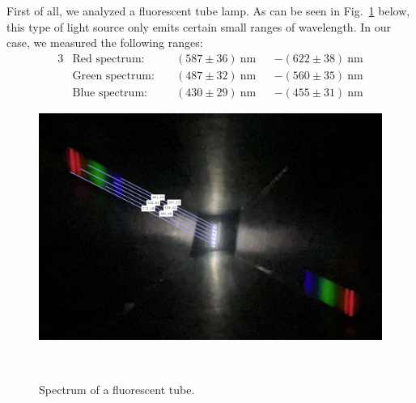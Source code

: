 First of all, we analyzed a fluorescent tube lamp. As can be seen in Fig.~\ref{fig_lamp1} below, this type of 
light source only emits certain small ranges of wavelength. In our case, we measured the following ranges:
\begin{alignat}{3}
    &\text{Red spectrum:} \; &&(587 \pm 36)~\si{\nano\meter} & &- (622 \pm 38)~\si{\nano\meter} \nonumber\\
    &\text{Green spectrum:} \; &&(487 \pm 32)~\si{\nano\meter} & &- (560 \pm 35)~\si{\nano\meter} \nonumber\\
    &\text{Blue spectrum:} \; &&(430 \pm 29)~\si{\nano\meter} & &- (455 \pm 31)~\si{\nano\meter} \nonumber
\end{alignat}
\vspace{-2em}
\begin{figure}[H]
    \centering
    \includegraphics[scale = 0.28]{src/images/lamp1_meas.png}
    \caption{Spectrum of a fluorescent tube.}~\label{fig_lamp1}
\end{figure}

